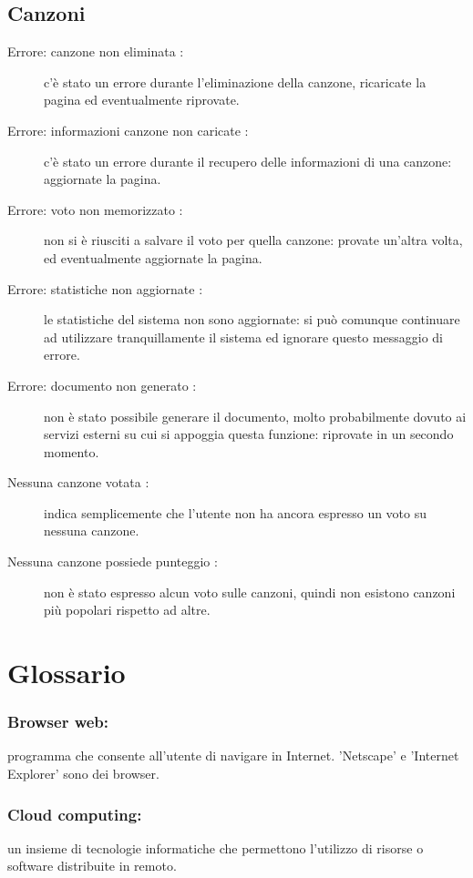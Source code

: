 \section{Canzoni}
\begin{description}
	\item[Errore: canzone non eliminata :] c'\`e stato un errore durante
	l'eliminazione della canzone, ricaricate la pagina ed eventualmente riprovate.
	\item[Errore: informazioni canzone non caricate :] c'\`e stato un errore
	durante il recupero delle informazioni di una canzone: aggiornate la pagina.
	\item[Errore: voto non memorizzato :] non si \`e riusciti a salvare il voto per
	quella canzone: provate un'altra volta, ed eventualmente aggiornate la pagina.
	\item[Errore: statistiche non aggiornate :] le statistiche del sistema non sono
	aggiornate: si pu\`o comunque continuare ad utilizzare tranquillamente il
	sistema ed ignorare questo messaggio di errore.
	\item[Errore: documento non generato :] non \`e stato possibile generare il
	documento, molto probabilmente dovuto ai servizi esterni su cui si appoggia
	questa funzione: riprovate in un secondo momento.
	\item[Nessuna canzone votata :] indica semplicemente che l'utente non ha ancora
	espresso un voto su nessuna canzone.
	\item[Nessuna canzone possiede punteggio :] non \`e stato espresso alcun
	voto sulle canzoni, quindi non esistono canzoni pi\`u popolari rispetto ad
	altre.
\end{description}

\chapter{Glossario}
\thispagestyle{fancy}

\subsection*{Browser web:} programma che consente all'utente di navigare in
Internet. 'Netscape' e 'Internet Explorer' sono dei browser. 
\subsection*{Cloud computing:} un insieme di tecnologie informatiche che
permettono l'utilizzo di risorse o software distribuite in remoto.

